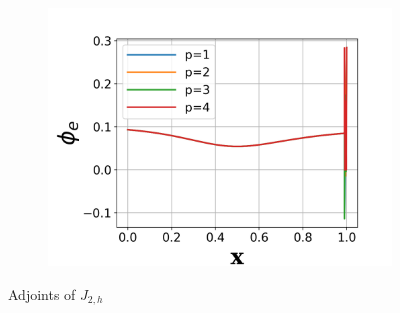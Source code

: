 \documentclass[a4paper]{article}
\begin{document}
\begin{figure}[!htbp]
\begin{subfigure}{0.45\textwidth}
    \includegraphics[width=1.0\linewidth]{figures/J2_phi_3.png}
    \label{fig:j2_phi3}
  \end{subfigure}
  \caption{Adjoints of $J_{2,h}$} 
  \label{fig:j2_phi}
\end{figure}
\end{document}
